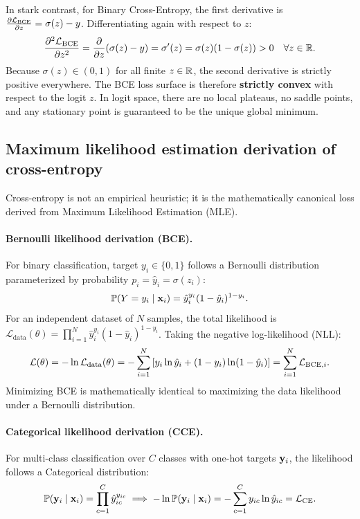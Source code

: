 \documentclass[../../main.tex]{subfiles}
\begin{document}
\begin{itemize}
    In stark contrast, for Binary Cross-Entropy, the first derivative is $\frac{\partial \mathcal{L}_{\text{BCE}}}{\partial z} = \sigma(z) - y$. Differentiating again with respect to $z$:
    \begin{equation}
    \label{eq:bce_second_derivative}
    \frac{\partial^2 \mathcal{L}_{\text{BCE}}}{\partial z^2} = \frac{\partial}{\partial z} (\sigma(z) - y) = \sigma'(z) = \sigma(z)(1 - \sigma(z)) > 0 \quad \forall z \in \mathbb{R}.
    \end{equation}
    Because $\sigma(z) \in (0, 1)$ for all finite $z \in \mathbb{R}$, the second derivative is strictly positive everywhere. The BCE loss surface is therefore \textbf{strictly convex} with respect to the logit $z$. In logit space, there are no local plateaus, no saddle points, and any stationary point is guaranteed to be the unique global minimum.
\end{itemize}

\subsection{Maximum likelihood estimation derivation of cross-entropy}
Cross-entropy is not an empirical heuristic; it is the mathematically canonical loss derived from Maximum Likelihood Estimation (MLE).

\paragraph{Bernoulli likelihood derivation (BCE).}
For binary classification, target $y_i \in \{0, 1\}$ follows a Bernoulli distribution parameterized by probability $p_i = \hat{y}_i = \sigma(z_i)$:
\begin{equation}
\mathbb{P}(Y = y_i \mid \mathbf{x}_i) = \hat{y}_i^{y_i} (1 - \hat{y}_i)^{1 - y_i}.
\end{equation}
For an independent dataset of $N$ samples, the total likelihood is $\mathcal{L}_{\text{data}}(\theta) = \prod_{i=1}^N \hat{y}_i^{y_i} (1 - \hat{y}_i)^{1 - y_i}$. Taking the negative log-likelihood (NLL):
\begin{equation}
\mathcal{L}(\theta) = - \ln \mathcal{L}_{\text{data}}(\theta) = - \sum_{i=1}^N \left[ y_i \ln \hat{y}_i + (1 - y_i) \ln(1 - \hat{y}_i) \right] = \sum_{i=1}^N \mathcal{L}_{\text{BCE}, i}.
\end{equation}
Minimizing BCE is mathematically identical to maximizing the data likelihood under a Bernoulli distribution.

\paragraph{Categorical likelihood derivation (CCE).}
For multi-class classification over $C$ classes with one-hot targets $\mathbf{y}_i$, the likelihood follows a Categorical distribution:
\begin{equation}
\mathbb{P}(\mathbf{y}_i \mid \mathbf{x}_i) = \prod_{c=1}^C \hat{y}_{ic}^{y_{ic}} \implies - \ln \mathbb{P}(\mathbf{y}_i \mid \mathbf{x}_i) = - \sum_{c=1}^C y_{ic} \ln \hat{y}_{ic} = \mathcal{L}_{\text{CE}}.
\end{equation}
\end{document}
